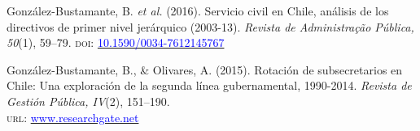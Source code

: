 \begin{publications}
\begin{benumerate}{7}
\item{\small Gonz\'alez-Bustamante, B. {\itshape et al.} (2016). Servicio civil en Chile, análisis de los directivos de primer nivel jerárquico (2003-13). {\itshape Revista de Administra\c{c}\~ao P\'ublica, 50}(1), 59--79. {\scshape doi}: \href{http://dx.doi.org/10.1590/0034-7612145767}{\textcolor{blue}{10.1590/0034-7612145767}}} \vspace{1mm}

\item{\small Gonz\'alez-Bustamante, B., \& Olivares, A. (2015). Rotación de subsecretarios en Chile: Una exploración de la segunda línea gubernamental, 1990-2014. {\itshape Revista de Gesti\'on P\'ublica, IV}(2), 151--190. \\ {\scshape url}: \href{https://www.researchgate.net/publication/321977889_Rotacion_de_subsecretarios_en_Chile_una_exploracion_de_la_segunda_linea_gubernamental_1990-2014}{\textcolor{blue}{www.researchgate.net}}} \pagebreak %
\end{benumerate}

\end{publications}


